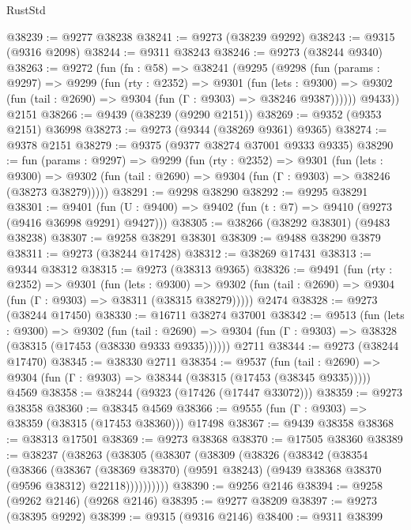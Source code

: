 \begin{lexlean}{RustStd}
\begin{coremodule}
{\begin{coremodule}
{{{{{{{{{{{{{{{{{{{{{{{{{{{{{{{{{{{{{{{{{{{{{{{{{{{{{{{@38239 := @9277 @38238
@38241 := @9273 (@38239 @9292)
@38243 := @9315 (@9316 @2098)
@38244 := @9311 @38243
@38246 := @9273 (@38244 @9340)
@38263 := @9272
    (fun (fn : @58) =>
    @38241
      (@9295
        (@9298
          (fun (params : @9297) =>
          @9299
            (fun (rty : @2352) =>
            @9301
              (fun (lets : @9300) =>
              @9302 (fun (tail : @2690) => @9304 (fun (Γ : @9303) => @38246 @9387))))))
        @9433))
    @2151
@38266 := @9439 (@38239 (@9290 @2151))
@38269 := @9352 (@9353 @2151) @36998
@38273 := @9273 (@9344 (@38269 @9361) @9365)
@38274 := @9378 @2151
@38279 := @9375 (@9377 @38274 @37001 @9333 @9335)
@38290 := fun (params : @9297) =>
  @9299
    (fun (rty : @2352) =>
    @9301
      (fun (lets : @9300) =>
      @9302 (fun (tail : @2690) => @9304 (fun (Γ : @9303) => @38246 (@38273 @38279)))))
@38291 := @9298 @38290
@38292 := @9295 @38291
@38301 := @9401
    (fun (U : @9400) => @9402 (fun (t : @7) => @9410 (@9273 (@9416 @36998 @9291) @9427)))
@38305 := @38266 (@38292 @38301) (@9483 @38238)
@38307 := @9258 @38291 @38301
@38309 := @9488 @38290 @3879
@38311 := @9273 (@38244 @17428)
@38312 := @38269 @17431
@38313 := @9344 @38312
@38315 := @9273 (@38313 @9365)
@38326 := @9491
    (fun (rty : @2352) =>
    @9301
      (fun (lets : @9300) =>
      @9302 (fun (tail : @2690) => @9304 (fun (Γ : @9303) => @38311 (@38315 @38279)))))
    @2474
@38328 := @9273 (@38244 @17450)
@38330 := @16711 @38274 @37001
@38342 := @9513
    (fun (lets : @9300) =>
    @9302
      (fun (tail : @2690) =>
      @9304 (fun (Γ : @9303) => @38328 (@38315 (@17453 (@38330 @9333 @9335))))))
    @2711
@38344 := @9273 (@38244 @17470)
@38345 := @38330 @2711
@38354 := @9537
    (fun (tail : @2690) => @9304 (fun (Γ : @9303) => @38344 (@38315 (@17453 (@38345 @9335)))))
    @4569
@38358 := @38244 (@9323 (@17426 (@17447 @33072)))
@38359 := @9273 @38358
@38360 := @38345 @4569
@38366 := @9555 (fun (Γ : @9303) => @38359 (@38315 (@17453 @38360))) @17498
@38367 := @9439 @38358
@38368 := @38313 @17501
@38369 := @9273 @38368
@38370 := @17505 @38360
@38389 := @38237
    (@38263
      (@38305
        (@38307
          (@38309
            (@38326
              (@38342
                (@38354
                  (@38366
                    (@38367
                      (@38369 @38370)
                      (@9591 @38243)
                      (@9439 @38368 @38370 (@9596 @38312) @22118))))))))))
@38390 := @9256 @2146
@38394 := @9258 (@9262 @2146) (@9268 @2146)
@38395 := @9277 @38209
@38397 := @9273 (@38395 @9292)
@38399 := @9315 (@9316 @2146)
@38400 := @9311 @38399
}}}}}}}}}}}}}}}}}}}}}}}}}}}}}}}}}}}}}}}}}}}}}}}}}}}}}}}
\end{coremodule}}
\end{coremodule}
\end{lexlean}

